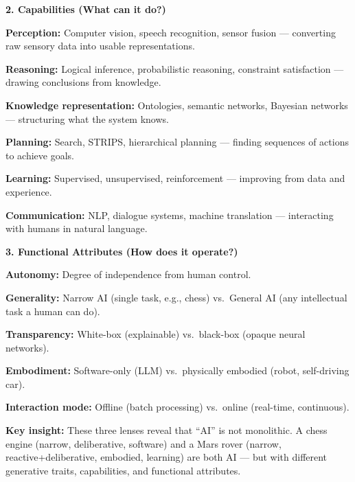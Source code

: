 \documentclass[12pt, a4paper]{article}
\begin{document}
\vspace{0.3em}
\noindent\textbf{2. Capabilities (What can it do?)}
\begin{keypoints}
  \item \textbf{Perception:} Computer vision, speech recognition, sensor fusion — converting raw sensory data into usable representations.
  \item \textbf{Reasoning:} Logical inference, probabilistic reasoning, constraint satisfaction — drawing conclusions from knowledge.
  \item \textbf{Knowledge representation:} Ontologies, semantic networks, Bayesian networks — structuring what the system knows.
  \item \textbf{Planning:} Search, STRIPS, hierarchical planning — finding sequences of actions to achieve goals.
  \item \textbf{Learning:} Supervised, unsupervised, reinforcement — improving from data and experience.
  \item \textbf{Communication:} NLP, dialogue systems, machine translation — interacting with humans in natural language.
\end{keypoints}

\vspace{0.3em}
\noindent\textbf{3. Functional Attributes (How does it operate?)}
\begin{keypoints}
  \item \textbf{Autonomy:} Degree of independence from human control.
  \item \textbf{Generality:} Narrow AI (single task, e.g., chess) vs.\ General AI (any intellectual task a human can do).
  \item \textbf{Transparency:} White-box (explainable) vs.\ black-box (opaque neural networks).
  \item \textbf{Embodiment:} Software-only (LLM) vs.\ physically embodied (robot, self-driving car).
  \item \textbf{Interaction mode:} Offline (batch processing) vs.\ online (real-time, continuous).
\end{keypoints}

\noindent\textbf{Key insight:} These three lenses reveal that ``AI'' is not monolithic. A chess engine (narrow, deliberative, software) and a Mars rover (narrow, reactive+deliberative, embodied, learning) are both AI — but with different generative traits, capabilities, and functional attributes.

\end{document}
